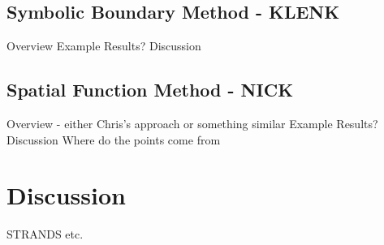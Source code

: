 \documentclass[11pt,letterpaper]{article}
\begin{document}
\subsection{Symbolic Boundary Method - KLENK}

Overview
Example
Results?
Discussion

\subsection{Spatial Function Method - NICK}

Overview - either Chris's approach or something similar
Example
Results?
Discussion 
Where do the points come from

\section{Discussion}
 
\begin{acknowledgements} 
\noindent
STRANDS etc.
\end{acknowledgements} 




\vspace{-0.25in}

{\parindent -10pt\leftskip 10pt\noindent



}

\end{document}
